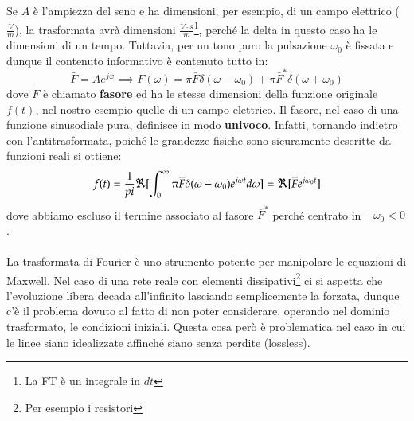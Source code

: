 \documentclass{book}
\begin{document}
        Se $A$ è l'ampiezza del seno e ha dimensioni, per esempio, di un campo elettrico ($\displaystyle\frac{V}{m}$), la trasformata avrà dimensioni $\displaystyle \frac{V \cdot s}{m}$\footnote{La FT è un integrale in $dt$}, perché la delta in questo caso ha le dimensioni di un tempo. Tuttavia, per un tono puro la pulsazione $\omega_{0}$ è fissata e dunque il contenuto informativo è contenuto tutto in:
        \begin{equation}
            \bar{F} = Ae^{j \varphi} \implies F(\omega) = \pi \bar{F}\delta(\omega-\omega_{0})+\pi \bar{F}^{*}\delta(\omega+\omega_{0})
        \end{equation}
        dove $\bar{F}$ è chiamato \textbf{fasore} ed ha le stesse dimensioni della funzione originale $f(t)$, nel nostro esempio quelle di un campo elettrico. Il fasore, nel caso di una funzione sinusodiale pura, definisce in modo \textbf{univoco}. Infatti, tornando indietro con l'antitrasformata, poiché le grandezze fisiche sono sicuramente descritte da funzioni reali si ottiene:
        \begin{equation}
            f(t) = \frac{1}{\\pi} \Re[\int_{0} ^{\infty} \pi\overline{F}\delta(\omega-\omega_{0})e^{j \omega t}d \omega] = \Re[\overline{F}e^{j \omega_{0}t}]
        \end{equation}
        dove abbiamo escluso il termine associato al fasore $\overline{F}^{*}$ perché centrato in $-\omega_{0} < 0$.
        \\ \\
        La trasformata di Fourier è uno strumento potente per manipolare le equazioni di Maxwell. Nel caso di una rete reale con elementi dissipativi\footnote{Per esempio i resistori} ci si aspetta che l'evoluzione libera decada all'infinito lasciando semplicemente la forzata, dunque c'è il problema dovuto al fatto di non poter considerare, operando nel dominio trasformato, le condizioni iniziali. Questa cosa però è problematica nel caso in cui le linee siano idealizzate affinché siano senza perdite (lossless).
        
\end{document}
